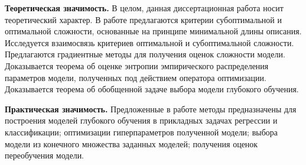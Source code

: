 \vspace{0.5cm}
\textbf{Теоретическая значимость.} В целом, данная диссертационная работа носит теоретический характер. В работе предлагаются критерии субоптимальной и оптимальной сложности, основанные на принципе минимальной длины описания. Исследуется взаимосвязь критериев оптимальной и субоптимальной сложности. Предлагаются градиентные методы для получения оценок сложности модели. Доказывается теорема об оценке энтропии эмпирического распределения параметров модели, полученных под действием оператора оптимизации.
Доказывается теорема об обобщенной задаче выбора модели глубокого обучения.


\vspace{0.5cm}
\textbf{Практическая значимость.} Предложенные в работе методы предназначены для построения моделей глубокого обучения в прикладных задачах регрессии и классификации; оптимизации гиперпараметров полученной модели; выбора модели из конечного множества заданных моделей; получения оценок переобучения модели.



